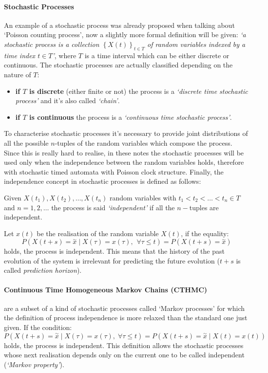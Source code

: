 \documentclass[12pt,a4paper]{article}
\begin{document}
\paragraph{Stochastic Processes}
An example of a stochastic process was already proposed when talking about `Poisson counting process', now a slightly more formal definition will be given: \emph{`a stochastic process is a collection $\left\lbrace X\left(t\right) \right\rbrace_{t\in T} $
of random variables indexed by a time index $t\in T$'}, where $T$ is a time interval which can be either discrete or continuous.
The stochastic processes are actually classified depending on the nature of $T$:
\begin{itemize}
\item \textbf{if $T$ is discrete} (either finite or not) the process is a \emph{`discrete time stochastic process'} 
and it's also called \emph{`chain'}.
\item \textbf{if $T$ is continuous} the process is a \emph{`continuous time stochastic process'}.
\end{itemize}
To characterise stochastic processes it's necessary to provide joint distributions of all the possible $n$-tuples of the random variables which compose the process. Since this is really hard to realise, in these notes the stochastic processes will be used
only when the independence between the random variables holds, therefore with stochastic timed automata with Poisson clock structure. Finally, the independence concept in stochastic processes is defined as follows:

\bigskip
\noindent 
Given $X(t_1), X(t_2),\dots, X(t_n)$ random variables with $t_1<t_2<\dots<t_n \in T$ and $n=1,2,\dots$ the process is said \textit{`independent'} if all the $n-$tuples are independent. 

\bigskip
\noindent 
Let $x(t)$ be the realisation of the random variable $X(t)$, if the equality:
$$
P\left(X\left(t+s\right)=\overset{\sim}{x} \mid X\left(\tau\right)=
x\left(\tau\right),\hspace{5pt}\forall\tau\leq t\right)=
P\left(X\left(t+s\right)=\overset{\sim}{x} \right)
$$
holds, the process is independent. This means that the history of the past evolution of the system is irrelevant for predicting the future evolution ($t+s$ is called \textit{prediction horizon}).
\paragraph{Continuous Time Homogeneous Markov Chains (CTHMC)} are a subset of a kind of stochastic processes called `Markov processes' for which the definition of process independence is more relaxed than the standard one just given. If the condition:
$$
P\left(X(t+s)=\overset{\sim}{x} \mid X(\tau)=
x(\tau),\;\forall\tau\leq t\right)=
P\left(X(t+s)=\overset{\sim}{x} \mid X(t)=x(t)\right)
$$
holds, the process is independent. This definition allows the stochastic processes whose next realisation depends only on the current one to be called independent (\textit{`Markov property'}).
\end{document}
